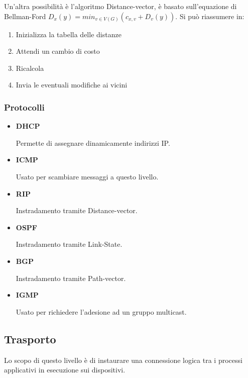 \documentclass{article}
\begin{document}
\noindent Un'altra possibilità è l'algoritmo Distance-vector, è basato sull'equazione di Bellman-Ford $D_x(y)=min_{v\in V(G)}(c_{x,v}+D_v(y))$. Si può riassumere in:
\begin{enumerate}
    \item Inizializza la tabella delle distanze
    \item Attendi un cambio di costo
    \item Ricalcola
    \item Invia le eventuali modifiche ai vicini
\end{enumerate}

\subsubsection{Protocolli}

\begin{itemize}
    \item \textbf{DHCP}

        Permette di assegnare dinamicamente indirizzi IP.

    \item \textbf{ICMP}

        Usato per scambiare messaggi a questo livello.

    \item \textbf{RIP}

        Instradamento tramite Distance-vector.

    \item \textbf{OSPF}

        Instradamento tramite Link-State.

    \item \textbf{BGP}

        Instradamento tramite Path-vector.

    \item \textbf{IGMP}

        Usato per richiedere l'adesione ad un gruppo multicast.
    
\end{itemize}

\subsection{Trasporto}

Lo scopo di questo livello è di instaurare una connessione logica tra i processi applicativi in esecuzione sui dispositivi.\newline
\end{document}
